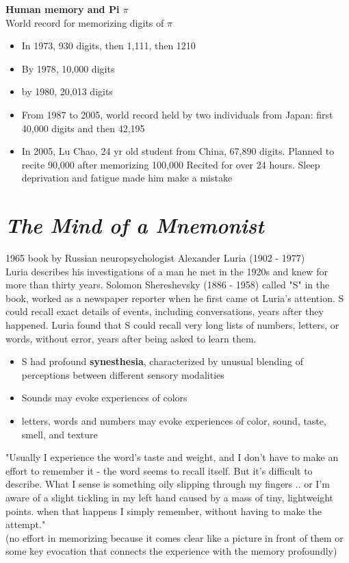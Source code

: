 \documentclass{article}
\begin{document}
\noindent\textbf{Human memory and Pi $\pi$} \\
World record for memorizing digits of $\pi$
\begin{itemize}
    \item In 1973, 930 digits, then 1,111, then 1210
    \item By 1978, 10,000 digits
    \item by 1980, 20,013 digits
    \item From 1987 to 2005, world record held by two individuals from Japan: first 40,000 digits and then 42,195
    \item In 2005, Lu Chao, 24 yr old student from China, 67,890 digits. Planned to recite 90,000 after memorizing 100,000
        \subitem Recited for over 24 hours. Sleep deprivation and fatigue made him make a mistake 
\end{itemize}

\newpage
\section{\textit{The Mind of a Mnemonist}}
1965 book by Russian neuropsychologist Alexander Luria (1902 - 1977) \\

Luria describes his investigations of a man he met in the 1920s and knew for more than thirty years. Solomon Shereshevsky (1886 - 1958) called "S" in the book, worked as a newspaper reporter when he first came ot Luria's attention. S could recall exact details of events, including conversations, years after they happened. Luria found that S could recall very long lists of numbers, letters, or words, without error, years after being asked to learn them. 

\begin{itemize}
    \item S had profound \textbf{synesthesia}, characterized by unusual blending of perceptions between different sensory modalities
    \item Sounds may evoke experiences of colors
    \item letters, words and numbers may evoke experiences of color, sound, taste, smell, and texture
\end{itemize}

"Usually I experience the word's taste and weight, and I don't have to make an effort to remember it - the word seems to recall itself. But it's difficult to describe. What I sense is something oily slipping through my fingers .. or I'm aware of a slight tickling in my left hand caused by a mass of tiny, lightweight points. when that happens I simply remember, without having to make the attempt." \\ 
(no effort in memorizing because it comes clear like a picture in front of them or some key evocation that connects the experience with the memory profoundly) \\
\end{document}
